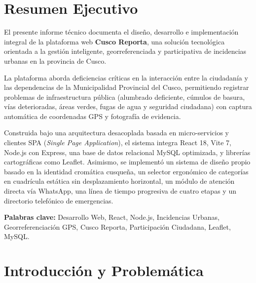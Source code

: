 \documentclass[12pt,a4paper]{article}
\begin{document}
\newpage
{}
\tableofcontents
\newpage
{}

\section*{Resumen Ejecutivo}

El presente informe técnico documenta el diseño, desarrollo e implementación integral de la plataforma web \textbf{Cusco Reporta}, una solución tecnológica orientada a la gestión inteligente, georreferenciada y participativa de incidencias urbanas en la provincia de Cusco. 

La plataforma aborda deficiencias críticas en la interacción entre la ciudadanía y las dependencias de la Municipalidad Provincial del Cusco, permitiendo registrar problemas de infraestructura pública (alumbrado deficiente, cúmulos de basura, vías deterioradas, áreas verdes, fugas de agua y seguridad ciudadana) con captura automática de coordenadas GPS y fotografía de evidencia. 

Construida bajo una arquitectura desacoplada basada en micro-servicios y clientes SPA (\textit{Single Page Application}), el sistema integra React 18, Vite 7, Node.js con Express, una base de datos relacional MySQL optimizada, y librerías cartográficas como Leaflet. Asimismo, se implementó un sistema de diseño propio basado en la identidad cromática cusqueña, un selector ergonómico de categorías en cuadrícula estática sin desplazamiento horizontal, un módulo de atención directa vía WhatsApp, una línea de tiempo progresiva de cuatro etapas y un directorio telefónico de emergencias.

\vspace{0.5cm}
\noindent\textbf{Palabras clave:} Desarrollo Web, React, Node.js, Incidencias Urbanas, Georreferenciación GPS, Cusco Reporta, Participación Ciudadana, Leaflet, MySQL.

\section{Introducción y Problemática}
\end{document}
